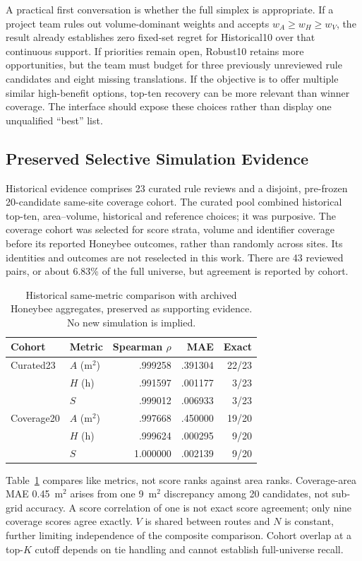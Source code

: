\documentclass{llncs}
\begin{document}
A practical first conversation is whether the full simplex is appropriate. If a project team rules out volume-dominant weights and accepts $w_A\geq w_H\geq w_V$, the result already establishes zero fixed-set regret for Historical10 over that continuous support. If priorities remain open, Robust10 retains more opportunities, but the team must budget for three previously unreviewed rule candidates and eight missing translations. If the objective is to offer multiple similar high-benefit options, top-ten recovery can be more relevant than winner coverage. The interface should expose these choices rather than display one unqualified ``best'' list.

\subsection{Preserved Selective Simulation Evidence}
Historical evidence comprises 23 curated rule reviews and a disjoint, pre-frozen 20-candidate same-site coverage cohort. The curated pool combined historical top-ten, area--volume, historical and reference choices; it was purposive. The coverage cohort was selected for score strata, volume and identifier coverage before its reported Honeybee outcomes, rather than randomly across sites. Its identities and outcomes are not reselected in this work. There are 43 reviewed pairs, or about 6.83\% of the full universe, but agreement is reported by cohort.

\begin{table}[tbp]\caption{Historical same-metric comparison with archived Honeybee aggregates, preserved as supporting evidence. No new simulation is implied.}\label{tab:agreement}\centering
\begin{tabular}{llrrr}\toprule Cohort & Metric & Spearman $\rho$ & MAE & Exact\\\midrule
Curated23 & $A$ (m$^2$) & .999258 & .391304 & 22/23\\ & $H$ (h) & .991597 & .001177 & 3/23\\ & $S$ & .999012 & .006933 & 3/23\\
Coverage20 & $A$ (m$^2$) & .997668 & .450000 & 19/20\\ & $H$ (h) & .999624 & .000295 & 9/20\\ & $S$ & 1.000000 & .002139 & 9/20\\\bottomrule\end{tabular}\end{table}

Table~\ref{tab:agreement} compares like metrics, not score ranks against area ranks. Coverage-area MAE 0.45~m$^2$ arises from one 9~m$^2$ discrepancy among 20 candidates, not sub-grid accuracy. A score correlation of one is not exact score agreement; only nine coverage scores agree exactly. $V$ is shared between routes and $N$ is constant, further limiting independence of the composite comparison. Cohort overlap at a top-$K$ cutoff depends on tie handling and cannot establish full-universe recall.
\end{document}

